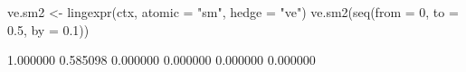 \begin{Schunk}
% --begin: "lingexpr"
\begin{Sinput}
 ve.sm2 <- lingexpr(ctx, atomic = "sm", hedge = "ve")
 ve.sm2(seq(from = 0, to = 0.5, by = 0.1))
\end{Sinput}
\begin{Soutput}
[1] 1.000000 0.585098 0.000000 0.000000 0.000000 0.000000
\end{Soutput}
%
% --end: "lingexpr"
\end{Schunk}
